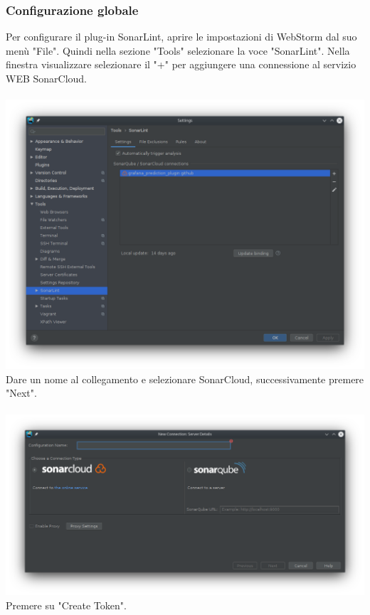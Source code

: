 \subsubsection{Configurazione globale}
Per configurare il plug-in SonarLint, aprire le impostazioni di WebStorm dal suo menù "File". Quindi nella sezione "Tools" selezionare la voce "SonarLint". Nella finestra visualizzare selezionare il "+" per aggiungere una connessione al servizio WEB SonarCloud.
\\
\\
\includegraphics[width=\textwidth,height=\textheight,keepaspectratio]{img/connection.png}
\pagebreak
\\
Dare un nome al collegamento e selezionare SonarCloud, successivamente premere "Next".
\\
\\
\includegraphics[width=\textwidth,height=\textheight,keepaspectratio]{img/connection-name.png}
\\
Premere su "Create Token".
